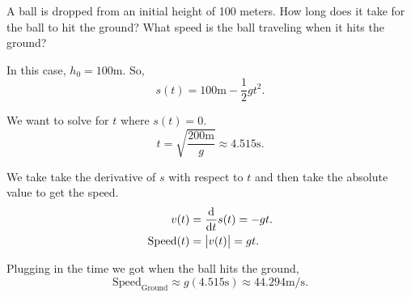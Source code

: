 \begin{example}
	A ball is dropped from an initial height of 100 meters.
	How long does it take for the ball to hit the ground?
	What speed is the ball traveling when it hits the ground?
\end{example}
\begin{answer}
	In this case, $h_0 = 100\text{m}$.
	So,
	\begin{equation*}
		s(t) = 100\text{m} - \frac{1}{2}gt^2.
	\end{equation*}
	
	We want to solve for $t$ where $s(t)=0$.
	\begin{equation*}
		t = \sqrt{\frac{200\text{m}}{g}} \approx 4.515\text{s}.
	\end{equation*}
	
	We take take the derivative of $s$ with respect to $t$ and then take the absolute value to get the speed.
	\begin{align*}
		v(t) &= \frac{\mathrm{d} }{\mathrm{d} t}s(t) = -gt. \\
		\text{Speed}(t) &= \big\lvert v(t) \big\rvert = gt.
	\end{align*}
	
	Plugging in the time we got when the ball hits the ground,
	\begin{equation*}
		\text{Speed}_{\text{Ground}} \approx g(4.515\text{s}) \approx 44.294\text{m/s}.
	\end{equation*}
\end{answer}